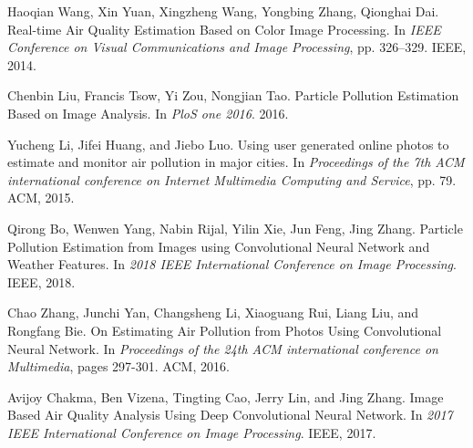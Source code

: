 \documentclass{article}
\begin{document}
\newpage
  


\begin{thebibliography}{1}

Haoqian Wang, Xin Yuan, Xingzheng Wang, Yongbing Zhang, Qionghai Dai.
\newblock Real-time Air Quality Estimation Based on Color
Image Processing.
\newblock In {\em IEEE Conference on Visual Communications and Image Processing}, pp. 326–329. IEEE, 2014.

Chenbin Liu, Francis Tsow, Yi Zou, Nongjian Tao.
\newblock Particle Pollution Estimation Based on Image
Analysis.
\newblock In {\em PloS one 2016}. 2016.

Yucheng Li, Jifei Huang, and Jiebo Luo. 
\newblock Using user generated online photos to estimate and monitor air pollution in major cities.
\newblock In {\em Proceedings of the 7th ACM international conference on Internet Multimedia Computing and Service}, pp. 79. ACM, 2015.

Qirong Bo, Wenwen Yang, Nabin Rijal, Yilin Xie, Jun Feng, Jing Zhang.
\newblock Particle Pollution Estimation from Images using Convolutional Neural Network and Weather Features.
\newblock In {\em 2018 IEEE International Conference on Image Processing}. IEEE, 2018.

Chao Zhang, Junchi Yan, Changsheng Li, Xiaoguang Rui, Liang Liu, and Rongfang Bie.
\newblock On Estimating Air Pollution from Photos Using
Convolutional Neural Network.
\newblock In {\em Proceedings of the 24th ACM international conference on Multimedia}, pages 297-301. ACM, 2016.

Avijoy Chakma, Ben Vizena, Tingting Cao, Jerry Lin, and Jing Zhang.
\newblock Image Based Air Quality Analysis Using Deep
Convolutional Neural Network.
\newblock In {\em 2017 IEEE International Conference on Image Processing}. IEEE, 2017.

\end{thebibliography}
\end{document}
